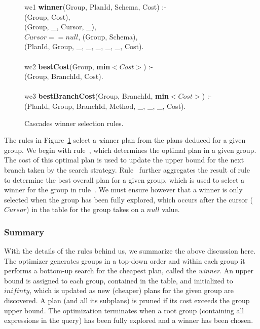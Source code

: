 {\begin{figure}
\ssp
\centering
\begin{boxedminipage}{\linewidth}
wc1 {\bf winner}(Group, PlanId, Schema, Cost) :- \\
(Group, Cost), \\
(Group, \_, Cursor, \_), \\
\datalogspace $Cursor ==  null$,
(Group, Schema), \\
(PlanId, Group, \_, \_, \_, \_, \_, Cost). \\
\\
wc2 {\bf bestCost}(Group, {\bf min}$<Cost>$) :- \\
(Group, BranchId, Cost). \\
\\
wc3 {\bf bestBranchCost}(Group, BranchId, {\bf min}$<Cost>$) :- \\
(PlanId, Group, BranchId, Method, \_, \_, \_, Cost). \\
  
\end{boxedminipage}
\caption{\label{ch:evita:fig:cascades_winner} Cascades winner selection rules.}
\end{figure}

The rules in Figure~\ref{ch:evita:fig:cascades_winner} select a {\emph winner} plan
from the plans deduced for a given group. We begin with rule~, which
determines the optimal plan in a given group. The cost of this optimal plan is
used to update the upper bound for the next branch taken by the search strategy.
Rule~ further aggregates the result of rule~ to determine the
best overall plan for a given group, which is used to select a winner for the
group in rule~. We must ensure however that a winner is only selected when
the group has been fully explored, which occurs after the cursor ($Cursor$) in
the  table for the group takes on a $null$ value. 


\subsubsection{Summary}

With the details of the rules behind us, we summarize the above discussion
here.  The optimizer generates groups in a top-down order and within each group
it performs a bottom-up search for the cheapest plan, called the {\em winner}.
An upper bound is assigned to each group, contained in the  table,
and initialized to $inifinty$, which is updated as new (cheaper) plans for the
given group are discovered.  A plan (and all its subplans) is pruned if its
cost exceeds the group upper bound.  The optimization terminates when a root
group (containing all expressions in the query) has been fully explored and a
winner has been chosen.

}
